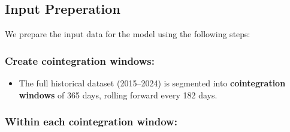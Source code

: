 \documentclass[12pt]{article}
\begin{document}
\subsection*{Input Preperation}

We prepare the input data for the model using the following steps:

\subsubsection*{Create cointegration windows:}
\begin{itemize}
    \item The full historical dataset (2015–2024) is segmented into \textbf{cointegration windows} of 365 days, rolling forward every 182 days.
\end{itemize}

\subsubsection*{Within each cointegration window:}
\end{document}
